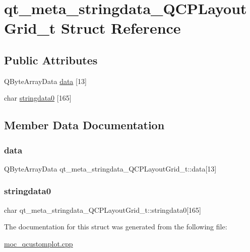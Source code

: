 \hypertarget{structqt__meta__stringdata__QCPLayoutGrid__t}{}\section{qt\+\_\+meta\+\_\+stringdata\+\_\+\+Q\+C\+P\+Layout\+Grid\+\_\+t Struct Reference}
\label{structqt__meta__stringdata__QCPLayoutGrid__t}
\subsection*{Public Attributes}
\begin{DoxyCompactItemize}
\item 
Q\+Byte\+Array\+Data \mbox{\hyperlink{structqt__meta__stringdata__QCPLayoutGrid__t_ab9a2518e0da08ddfb279fb649cdec091}{data}} \mbox{[}13\mbox{]}
\item 
char \mbox{\hyperlink{structqt__meta__stringdata__QCPLayoutGrid__t_a0592c486ce0adf2a3a83670727f00df2}{stringdata0}} \mbox{[}165\mbox{]}
\end{DoxyCompactItemize}


\subsection{Member Data Documentation}
\mbox{\label{structqt__meta__stringdata__QCPLayoutGrid__t_ab9a2518e0da08ddfb279fb649cdec091}} 
\subsubsection{\texorpdfstring{data}{data}}
{\footnotesize\ttfamily Q\+Byte\+Array\+Data qt\+\_\+meta\+\_\+stringdata\+\_\+\+Q\+C\+P\+Layout\+Grid\+\_\+t\+::data\mbox{[}13\mbox{]}}

\mbox{\label{structqt__meta__stringdata__QCPLayoutGrid__t_a0592c486ce0adf2a3a83670727f00df2}} 
\subsubsection{\texorpdfstring{stringdata0}{stringdata0}}
{\footnotesize\ttfamily char qt\+\_\+meta\+\_\+stringdata\+\_\+\+Q\+C\+P\+Layout\+Grid\+\_\+t\+::stringdata0\mbox{[}165\mbox{]}}



The documentation for this struct was generated from the following file\+:\begin{DoxyCompactItemize}
\item 
\mbox{\hyperlink{moc__qcustomplot_8cpp}{moc\+\_\+qcustomplot.\+cpp}}\end{DoxyCompactItemize}
